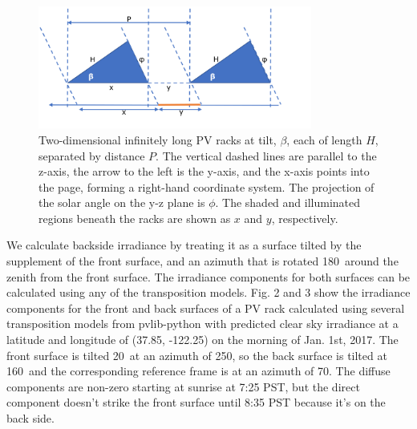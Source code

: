 \documentclass[conference]{IEEEtran}
\begin{document}
\begin{figure}
\centering
\includegraphics[width=9cm]{2d_infinite_sheds.png}
\caption{Two-dimensional infinitely long PV racks at tilt, $\beta$, each of length $H$, separated by distance $P$.  The vertical dashed lines are parallel to the z-axis, the arrow to the left is the y-axis, and the x-axis points into the page, forming a right-hand coordinate system.  The projection of the solar angle on the y-z plane is $\phi$. The shaded and illuminated regions beneath the racks are shown as $x$ and $y$, respectively.}
\end{figure}

We calculate backside irradiance by treating it as a surface tilted by the supplement of the front surface, and an azimuth that is rotated 180\degree\ around the zenith from the front surface.  The irradiance components for both surfaces can be calculated using any of the transposition models.  Fig. 2 and 3 show the irradiance components for the front and back surfaces of a PV rack calculated using several transposition models from pvlib-python \cite{Holmgren2018} with predicted clear sky irradiance at a latitude and longitude of (37.85\degree, -122.25\degree) on the morning of Jan. 1st, 2017.  The front surface is tilted 20\degree\ at an azimuth of 250\degree, so the back surface is tilted at 160\degree\ and the corresponding reference frame is at an azimuth of 70\degree.  The diffuse components are non-zero starting at sunrise at 7:25 PST, but the direct component doesn’t strike the front surface until 8:35 PST because it’s on the back side.
\end{document}
